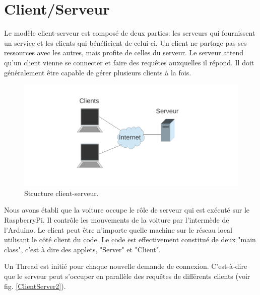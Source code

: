 \documentclass[a4paper,11pt]{report}
\begin{document}
{\section{Client/Serveur\label{ClientServeur}}


Le modèle client-serveur est composé de deux parties: les serveurs qui fournissent un service et les clients qui bénéficient de celui-ci. Un client ne partage pas ses ressources avec les autres, mais profite de celles du serveur. Le serveur attend qu'un client vienne se connecter et faire des requêtes auxquelles il répond. Il doit généralement être capable de gérer plusieurs clients à la fois.

\begin{figure}[h]
\includegraphics[width=1.0\textwidth]{figures/Client_Server1.pdf}
\caption[Structure client-serveur]{\label{ClientServer1}Structure client-serveur.}
\end{figure}

Nous avons établi que la voiture occupe le rôle de serveur qui est exécuté sur le RaspberryPi. Il contrôle les mouvements de la voiture par l'intermède de l'Arduino. Le client peut être n'importe quelle machine sur le réseau local utilisant le côté client du code. Le code est effectivement constitué de deux "main class", c'est à dire des applets, "Server" et "Client".  

Un Thread est initié pour chaque nouvelle demande de connexion. C'est-à-dire que le serveur peut s'occuper en parallèle des requêtes de différents clients (voir fig. \ref{ClientServer2}). 

}
\end{document}
